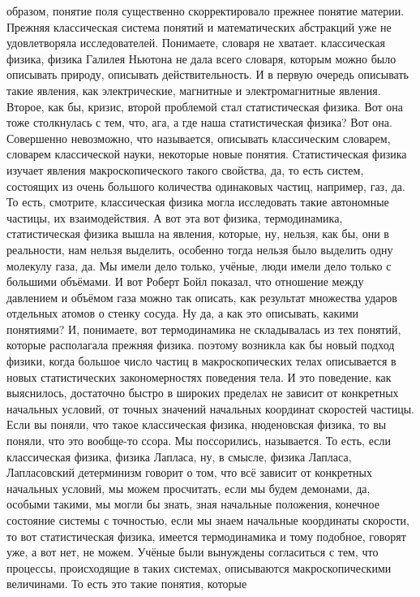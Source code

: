 образом, понятие поля существенно скорректировало прежнее понятие материи.
Прежняя классическая система понятий и математических абстракций уже не
удовлетворяла исследователей. Понимаете, словаря не хватает. классическая
физика, физика Галилея Ньютона не дала всего словаря, которым можно было
описывать природу, описывать действительность. И в первую очередь описывать
такие явления, как электрические, магнитные и электромагнитные явления. Второе,
как бы, кризис, второй проблемой стал статистическая физика. Вот она тоже
столкнулась с тем, что, ага, а где наша статистическая физика? Вот она.
Совершенно невозможно, что называется, описывать классическим словарем, словарем
классической науки, некоторые новые понятия. Статистическая физика изучает
явления макроскопического такого свойства, да, то есть систем, состоящих из
очень большого количества одинаковых частиц, например, газ, да. То есть,
смотрите, классическая физика могла исследовать такие автономные частицы, их
взаимодействия. А вот эта вот физика, термодинамика, статистическая физика вышла
на явления, которые, ну, нельзя, как бы, они в реальности, нам нельзя выделить,
особенно тогда нельзя было выделить одну молекулу газа, да. Мы имели дело
только, учёные, люди имели дело только с большими объёмами. И вот Роберт Бойл
показал, что отношение между давлением и объёмом газа можно так описать, как
результат множества ударов отдельных атомов о стенку сосуда. Ну да, а как это
описывать, какими понятиями? И, понимаете, вот термодинамика не складывалась из
тех понятий, которые располагала прежняя физика. поэтому возникла как бы новый
подход физики, когда большое число частиц в макроскопических телах описывается в
новых статистических закономерностях поведения тела. И это поведение, как
выяснилось, достаточно быстро в широких пределах не зависит от конкретных
начальных условий, от точных значений начальных координат скоростей частицы.
Если вы поняли, что такое классическая физика, нюденовская физика, то вы поняли,
что это вообще-то ссора. Мы поссорились, называется. То есть, если классическая
физика, физика Лапласа, ну, в смысле, физика Лапласа, Лапласовский детерминизм
говорит о том, что всё зависит от конкретных начальных условий, мы можем
просчитать, если мы будем демонами, да, особыми такими, мы могли бы знать, зная
начальные положения, конечное состояние системы с точностью, если мы знаем
начальные координаты скорости, то вот статистическая физика, имеется
термодинамика и тому подобное, говорят уже, а вот нет, не можем. Учёные были
вынуждены согласиться с тем, что процессы, происходящие в таких системах,
описываются макроскопическими величинами. То есть это такие понятия, которые
